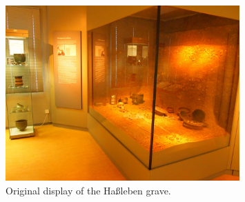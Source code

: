 \begin{figure}[]
	\centering
	\includegraphics[width=0.8\textwidth]{../pics/Original.png}
	\caption{Original display of the Haßleben grave.}
	\label{fig:museums_original}
\end{figure}

